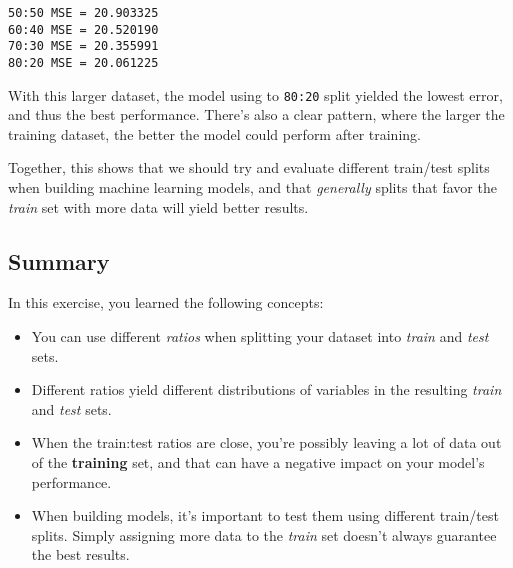 \documentclass[11pt]{article}
\providecommand{\tightlist}{%
      \setlength{\itemsep}{0pt}\setlength{\parskip}{0pt}}
\begin{document}
    \begin{Verbatim}[commandchars=\\\{\}]
50:50 MSE = 20.903325
60:40 MSE = 20.520190
70:30 MSE = 20.355991
80:20 MSE = 20.061225
    \end{Verbatim}

    With this larger dataset, the model using to \texttt{80:20} split
yielded the lowest error, and thus the best performance. There's also a
clear pattern, where the larger the training dataset, the better the
model could perform after training.

Together, this shows that we should try and evaluate different
train/test splits when building machine learning models, and that
\emph{generally} splits that favor the \emph{train} set with more data
will yield better results.

\hypertarget{summary}{%
\subsection{Summary}\label{summary}}

In this exercise, you learned the following concepts:

\begin{itemize}
\tightlist
\item
  You can use different \emph{ratios} when splitting your dataset into
  \emph{train} and \emph{test} sets.
\item
  Different ratios yield different distributions of variables in the
  resulting \emph{train} and \emph{test} sets.
\item
  When the train:test ratios are close, you're possibly leaving a lot of
  data out of the \textbf{training} set, and that can have a negative
  impact on your model's performance.
\item
  When building models, it's important to test them using different
  train/test splits. Simply assigning more data to the \emph{train} set
  doesn't always guarantee the best results.
\end{itemize}


    
    
    
\end{document}
